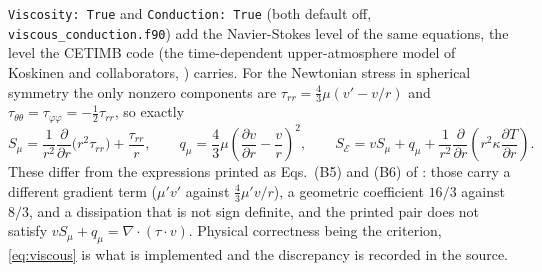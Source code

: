 \texttt{Viscosity: True} and \texttt{Conduction: True} (both default off,
\texttt{viscous\_conduction.f90}) add the Navier-Stokes level of the same
equations, the level the CETIMB code (the time-dependent upper-atmosphere model of Koskinen and collaborators, \citealt{Koskinen2013, Koskinen2022}) carries.  For
the Newtonian stress in spherical symmetry the only nonzero components are
$\tau_{rr} = \tfrac{4}{3}\mu(v' - v/r)$ and
$\tau_{\theta\theta} = \tau_{\varphi\varphi} = -\tfrac12\tau_{rr}$, so
exactly
%
\begin{equation}
  S_\mu = \frac{1}{r^2}\frac{\partial}{\partial r}\bigl(r^2\tau_{rr}\bigr)
          + \frac{\tau_{rr}}{r},
  \qquad
  q_\mu = \frac{4}{3}\mu\left(\frac{\partial v}{\partial r} - \frac{v}{r}\right)^{\!2},
  \qquad
  S_{\mathcal{E}} = v S_\mu + q_\mu
        + \frac{1}{r^2}\frac{\partial}{\partial r}
          \left(r^2\kappa\frac{\partial T}{\partial r}\right).
  \label{eq:viscous}
\end{equation}
%
These differ from the expressions printed as Eqs.~(B5) and (B6) of
\citet{Koskinen2022}: those carry a different gradient term
($\mu' v'$ against $\tfrac43\mu' v/r$), a geometric coefficient $16/3$ against
$8/3$, and a dissipation that is not sign definite, and the printed pair does
not satisfy $vS_\mu + q_\mu = \nabla\!\cdot\!(\tau\cdot v)$.  Physical
correctness being the criterion, \eqref{eq:viscous} is what is implemented and
the discrepancy is recorded in the source.

